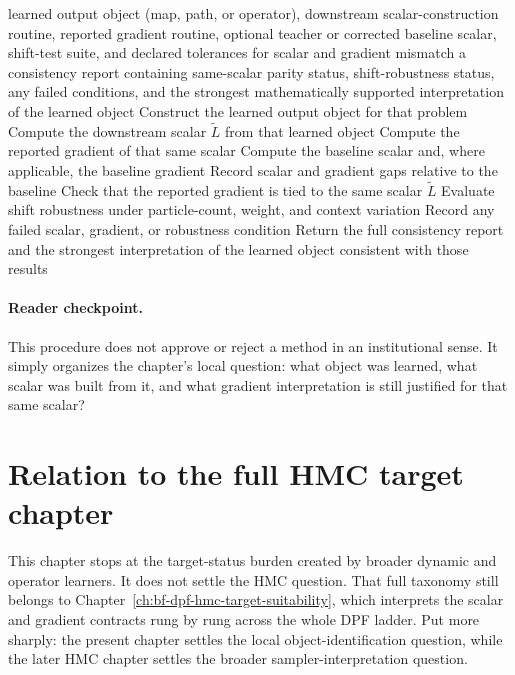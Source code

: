 \begin{algorithm}[ht]
\caption{\texttt{audit\_dynamic\_transport\_target\_contract}}
\begin{algorithmic}[1]
\Require learned output object (map, path, or operator), downstream scalar-construction routine, reported gradient routine, optional teacher or corrected baseline scalar, shift-test suite, and declared tolerances for scalar and gradient mismatch
\Ensure a consistency report containing same-scalar parity status, shift-robustness status, any failed conditions, and the strongest mathematically supported interpretation of the learned object
  \State Construct the learned output object for that problem
  \State Compute the downstream scalar \(\widetilde L\) from that learned object
  \State Compute the reported gradient of that same scalar
    \State Compute the baseline scalar and, where applicable, the baseline gradient
    \State Record scalar and gradient gaps relative to the baseline
  \EndIf
  \State Check that the reported gradient is tied to the same scalar
  \(\widetilde L\)
  \State Evaluate shift robustness under particle-count, weight, and context
  variation
  \State Record any failed scalar, gradient, or robustness condition
\EndFor
\State Return the full consistency report and the strongest interpretation of the
learned object consistent with those results
\end{algorithmic}
\end{algorithm}

\paragraph{Reader checkpoint.}
This procedure does not approve or reject a method in an institutional sense.  It
simply organizes the chapter's local question: what object was learned, what scalar
was built from it, and what gradient interpretation is still justified for that
same scalar?

\section{Relation to the full HMC target chapter}
\label{sec:bf-neural-ot-dynamic-handoff}

This chapter stops at the target-status burden created by broader dynamic and
operator learners.  It does not settle the HMC question.  That full taxonomy still
belongs to Chapter~\ref{ch:bf-dpf-hmc-target-suitability}, which interprets the
scalar and gradient contracts rung by rung across the whole DPF ladder.  Put more
sharply: the present chapter settles the local object-identification question,
while the later HMC chapter settles the broader sampler-interpretation question.

